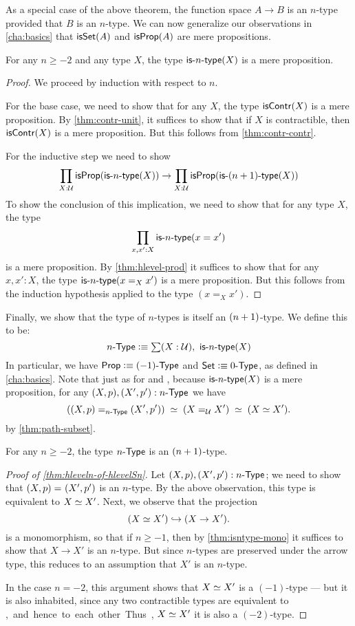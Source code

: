 As a special case of the above theorem, the function space $A \to B$ is an $n$-type provided that $B$ is an $n$-type.
We can now generalize our observations in \autoref{cha:basics} that $\isset(A)$ and $\isprop(A)$ are mere propositions.

\begin{thm}\label{thm:isaprop-isofhlevel}
 For any $n \geq -2$ and any type $X$, the type $\istype{n}(X)$ is a mere proposition.
\end{thm}
\begin{proof}
  We proceed by induction with respect to $n$.

 For the base case, we need to show that for any $X$, the type $\iscontr(X)$ is a mere proposition.
 By \autoref{thm:contr-unit}, it suffices to show that if $X$ is contractible, then $\iscontr(X)$ is a mere proposition.
 But this follows from \autoref{thm:contr-contr}.

For the inductive step we need to show
\[\prod_{X : \type} \isprop (\istype{n}(X)) \to \prod_{X : \type} \isprop (\istype{\nplusone}(X)) \]
To show the conclusion of this implication, we need to show that for any type $X$, the type
    \[\prod_{x, x' : X}\istype{n}(x = x')\]
is a mere proposition. By \autoref{thm:hlevel-prod} it suffices to show that for any $x, x' : X$, the type $\istype{n}(x =_X x')$ is a mere proposition.
But this follows from the induction hypothesis applied to the type $(x =_X x')$.
\end{proof}

Finally, we show that the type of $n$-types is itself an $\nplusone$-type.
We define this to be:
\[\ntype{n} \defeq \sm{X : \type} \istype{n}(X) \]
In particular, we have $\prop \defeq \ntype{(-1)}$ and $\set \defeq \ntype{0}$, as defined in \autoref{cha:basics}.
Note that just as for \prop and \set, because $\istype{n}(X)$ is a mere proposition, for any $(X,p), (X',p'):\ntype{n}$ we have
\[ (\id[\ntype{n}]{(X, p)}{(X', p')}) \;\simeq\; (\id[\type] X X') \;\simeq\; (\eqv{X}{X'}).\]
by \autoref{thm:path-subset}.

\begin{thm}\label{thm:hleveln-of-hlevelSn}
 For any $n \geq -2$, the type $\ntype{n}$ is an $\nplusone$-type.
\end{thm}
\begin{proof}[Proof of \autoref{thm:hleveln-of-hlevelSn}]
  Let $(X, p), (X', p') : \ntype{n}$; we need to show that $\id{(X, p)}{(X', p')}$ is an $n$-type.
  By the above observation, this type is equivalent to $\eqv{X}{X'}$.
  Next, we observe that the projection
  \[(\eqv{X}{X'}) \hookrightarrow (X \rightarrow X').\]
  is a monomorphism, so that if $n\geq -1$, then by \autoref{thm:isntype-mono} it suffices to show that $X \rightarrow X'$ is an $n$-type.
  But since $n$-types are preserved under the arrow type, this reduces to an assumption that $X'$ is an $n$-type.

  In the case $n=-2$, this argument shows that $\eqv{X}{X'}$ is a $(-1)$-type --- but it is also inhabited, since any two contractible types are equivalent to \unit, and hence to each other.
  Thus, $\eqv{X}{X'}$ it is also a $(-2)$-type.
\end{proof}

